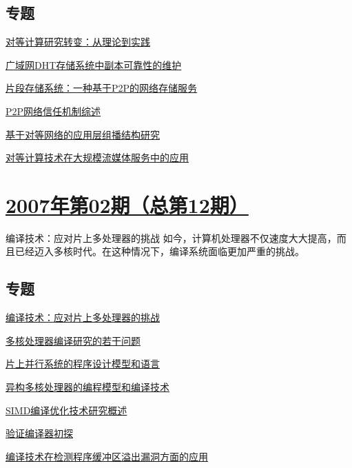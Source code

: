 \documentclass[a4paper]{article}
\begin{document}
\subsection{专题}
\href{http://history.ccf.org.cn/resources/1190201776262/2010/04/15/013006.pdf}{对等计算研究转变：从理论到实践}

\href{http://history.ccf.org.cn/resources/1190201776262/2010/04/15/013008.pdf}{广域网DHT存储系统中副本可靠性的维护}

\href{http://history.ccf.org.cn/resources/1190201776262/2010/04/15/013021.pdf}{片段存储系统：一种基于P2P的网络存储服务}

\href{http://history.ccf.org.cn/resources/1190201776262/2010/04/15/013031.pdf}{P2P网络信任机制综述}

\href{http://history.ccf.org.cn/resources/1190201776262/2010/04/15/013041.pdf}{基于对等网络的应用层组播结构研究}

\href{http://history.ccf.org.cn/resources/1190201776262/2010/04/15/013051.pdf}{对等计算技术在大规模流媒体服务中的应用}


\section{\href{http://history.ccf.org.cn/sites/ccf/jsjtbbd.jsp?contentId=2542567628953}{\textbf{2007年第02期（总第12期）}}}
编译技术：应对片上多处理器的挑战 如今，计算机处理器不仅速度大大提高，而且已经迈入多核时代。在这种情况下，编译系统面临更加严重的挑战。
\subsection{专题}
\href{http://history.ccf.org.cn/resources/1190201776262/2010/04/15/012016.pdf}{编译技术：应对片上多处理器的挑战}

\href{http://history.ccf.org.cn/resources/1190201776262/2010/04/15/012018.pdf}{多核处理器编译研究的若干问题}

\href{http://history.ccf.org.cn/resources/1190201776262/2010/04/15/012023.pdf}{片上并行系统的程序设计模型和语言}

\href{http://history.ccf.org.cn/resources/1190201776262/2010/04/15/012032.pdf}{异构多核处理器的编程模型和编译技术}

\href{http://history.ccf.org.cn/resources/1190201776262/2010/04/15/012040.pdf}{SIMD编译优化技术研究概述}

\href{http://history.ccf.org.cn/resources/1190201776262/2010/04/15/012049.pdf}{验证编译器初探}

\href{http://history.ccf.org.cn/resources/1190201776262/2010/04/15/012057.pdf}{编译技术在检测程序缓冲区溢出漏洞方面的应用}
\end{document}
